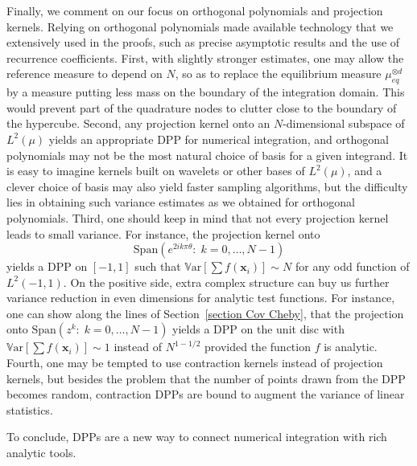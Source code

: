\documentclass[a4paper,11pt]{article}
\numberwithin{equation}{section}
\theoremstyle{definition}
\newcommand{\rev}[1]{#1}
\newcommand{\bv}{\mathbf}
\newcommand{\Var}{\mathbb{V}{\mathrm{ar}}}
\begin{document}
\rev{Finally, we comment on our focus on orthogonal polynomials and projection kernels.} Relying on orthogonal polynomials made available technology that we extensively used in the proofs, such as precise asymptotic results and the use of recurrence coefficients. First, with slightly stronger estimates, one may allow the reference measure to depend on $N$, so as to replace the equilibrium measure $\mu_{eq}^{\otimes d}$ by a measure putting less mass on the boundary of the integration domain. This would prevent part of the quadrature nodes to clutter close to the boundary of the hypercube. Second, any projection kernel onto an $N$-dimensional subspace of $L^2(\mu)$ yields an appropriate DPP for numerical integration, and orthogonal polynomials may not be the most natural choice of basis for a given integrand. It is easy to imagine kernels built on wavelets or other bases of $L^2(\mu)$, and a clever choice of basis may also yield faster sampling algorithms, but the difficulty lies in obtaining such variance estimates as we obtained for orthogonal polynomials.
\rev{Third, one should keep in mind that not every projection kernel leads to small variance. For instance, the projection kernel onto $$\mathrm{Span}(e^{2ik\pi\theta}:\; k=0,\ldots,N-1)$$ yields a DPP on $[-1,1]$ such that $\Var[\sum f(\bv x_i)] \sim N$  for any odd function of $L^2(-1,1)$.
On the positive side, extra complex structure can buy us further variance reduction in even dimensions for analytic test functions. For instance, one can show along the lines of Section~\ref{section Cov Cheby}, that the projection onto $\mathrm{Span}(z^k:\; k=0,\ldots,N-1)$ yields a DPP on the unit disc with $\Var[\sum f(\bv x_i)] \sim 1$ instead of $N^{1-1/2}$ provided the function $f$ is analytic. Fourth, one may be tempted to use contraction kernels instead of projection kernels, but besides the problem that the number of points drawn from the DPP becomes random, contraction DPPs are bound to augment the variance of linear statistics.}

To conclude, DPPs are a new way to connect numerical integration with rich analytic tools.%

\end{document}
